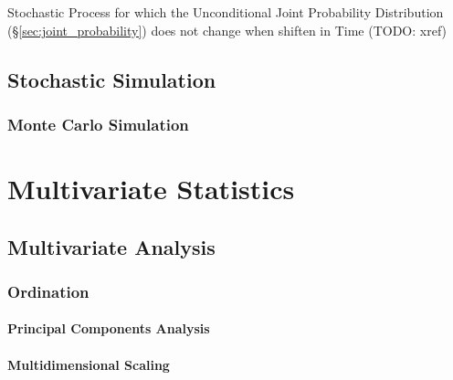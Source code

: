 Stochastic Process for which the Unconditional Joint Probability Distribution
(\S\ref{sec:joint_probability}) does not change when shiften in Time (TODO:
xref)



\subsection{Stochastic Simulation}\label{sec:stochastic_simulation}

\subsubsection{Monte Carlo Simulation}\label{sec:monte_carlo}



\section{Multivariate Statistics}\label{sec:multivariate_statistics}

\subsection{Multivariate Analysis}\label{sec:multivariate_analysis}

\subsubsection{Ordination}\label{sec:ordination}

\paragraph{Principal Components Analysis}
\label{sec:principal_components_analysis}\hfill

\paragraph{Multidimensional Scaling}\label{sec:multidimensional_scaling}\hfill


